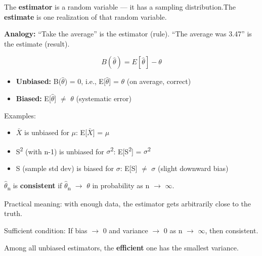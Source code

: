 
The \textbf{estimator} is a random variable — it has a sampling distribution.\PSbr{}The \textbf{estimate} is one realization of that random variable.

\textbf{Analogy:} ``Take the average'' is the estimator (rule). ``The average was 3.47'' is the estimate (result).



\[B(\hat{\theta}) = E[\hat{\theta}] - \theta\]

\begin{itemize}
\tightlist
\item
  \textbf{Unbiased:} B(\ensuremath{\hat{\theta}}) = 0, i.e., E[\ensuremath{\hat{\theta}}] = \ensuremath{\theta} (on average, correct)
\item
  \textbf{Biased:} E[\ensuremath{\hat{\theta}}] \ensuremath{\neq} \ensuremath{\theta} (systematic error)
\end{itemize}

Examples:

\begin{itemize}
\tightlist
\item
  \ensuremath{\bar{X}} is unbiased for \ensuremath{\mu}: E[\ensuremath{\bar{X}}] = \ensuremath{\mu} \PSyes{}
\item
  S\textsuperscript{2} (with n-1) is unbiased for \ensuremath{\sigma}\textsuperscript{2}: E[S\textsuperscript{2}] = \ensuremath{\sigma}\textsuperscript{2} \PSyes{}
\item
  S (sample std dev) is biased for \ensuremath{\sigma}: E[S] \ensuremath{\neq} \ensuremath{\sigma} (slight downward bias)
\end{itemize}


\ensuremath{\hat{\theta}}\textsubscript{n} is \textbf{consistent} if \ensuremath{\hat{\theta}}\textsubscript{n} \ensuremath{\to} \ensuremath{\theta} in probability as n \ensuremath{\to} \ensuremath{\infty}.

Practical meaning: with enough data, the estimator gets arbitrarily close to the truth.

Sufficient condition: If bias \ensuremath{\to} 0 and variance \ensuremath{\to} 0 as n \ensuremath{\to} \ensuremath{\infty}, then consistent.


Among all unbiased estimators, the \textbf{efficient} one has the smallest variance.

